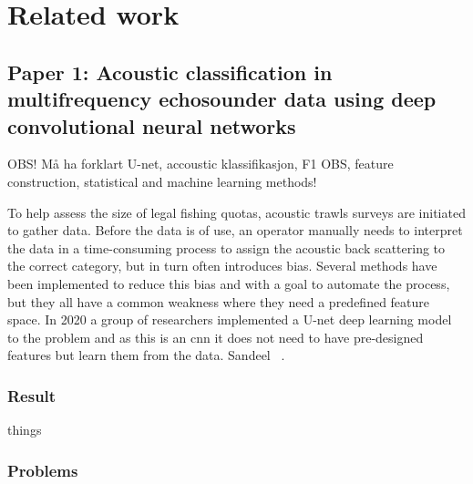 \chapter{Related work}



\section{Paper 1: Acoustic classification in multifrequency echosounder data using deep convolutional neural networks} \label{unet_paper_acoustic}
    
    
    OBS! Må ha forklart U-net, accoustic klassifikasjon, F1 OBS, feature construction, statistical and machine learning methods!
    
    To help assess the size of legal fishing quotas, acoustic trawls surveys are initiated to gather data. Before the data is of use, an operator manually needs to interpret the data in a time-consuming process to assign the acoustic back scattering to the correct category, but in turn often introduces bias. Several methods have been implemented to reduce this bias and with a goal to automate the process, but they all have a common weakness where they need a predefined feature space.  In 2020 a group of researchers implemented a U-net deep learning model to the problem and as this is an \gls{cnn} it does not need to have pre-designed features but learn them from the data. Sandeel  ~\cite{brautaset2020acoustic}. 
    

    
    \subsection{Result}
        things
    \subsection{Problems}